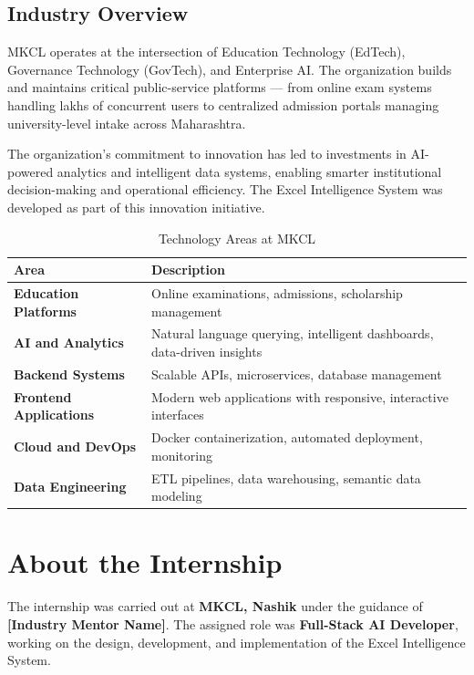 \documentclass[12pt,a4paper]{report}
\begin{document}
\subsection{Industry Overview}

MKCL operates at the intersection of Education Technology (EdTech), Governance Technology (GovTech), and Enterprise AI. The organization builds and maintains critical public-service platforms --- from online exam systems handling lakhs of concurrent users to centralized admission portals managing university-level intake across Maharashtra.

The organization's commitment to innovation has led to investments in AI-powered analytics and intelligent data systems, enabling smarter institutional decision-making and operational efficiency. The Excel Intelligence System was developed as part of this innovation initiative.

\begin{table}[H]
\centering
\caption{Technology Areas at MKCL}
\begin{tabular}{>{\bfseries}p{4.5cm} p{8cm}}
\toprule
\textbf{Area} & \textbf{Description} \\
\midrule
Education Platforms & Online examinations, admissions, scholarship management \\
AI and Analytics & Natural language querying, intelligent dashboards, data-driven insights \\
Backend Systems & Scalable APIs, microservices, database management \\
Frontend Applications & Modern web applications with responsive, interactive interfaces \\
Cloud and DevOps & Docker containerization, automated deployment, monitoring \\
Data Engineering & ETL pipelines, data warehousing, semantic data modeling \\
\bottomrule
\end{tabular}
\label{tab:mkcl_areas}
\end{table}

\section{About the Internship}

The internship was carried out at \textbf{MKCL, Nashik} under the guidance of \textbf{[Industry Mentor Name]}. The assigned role was \textbf{Full-Stack AI Developer}, working on the design, development, and implementation of the Excel Intelligence System.
\end{document}
